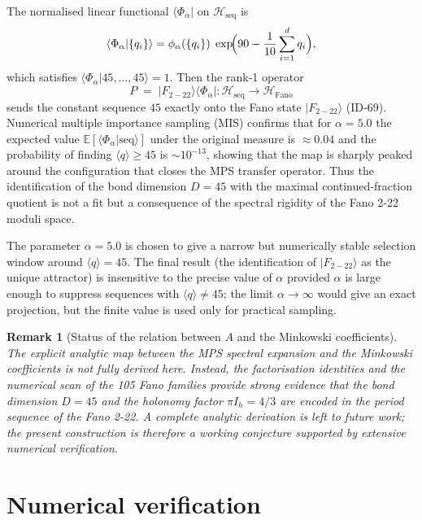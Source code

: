 \documentclass[12pt]{article}
\newtheorem{remark}{Remark}
\begin{document}
The normalised linear functional \(\langle\Phi_\alpha|\) on \(\mathcal{H}_{\text{seq}}\) is
\begin{equation}
\langle\Phi_\alpha|\{q_i\}\rangle = \phi_\alpha(\{q_i\})\; \exp\!\Bigl(90-\frac{1}{10}\sum_{i=1}^{d}q_i\Bigr),
\end{equation}
which satisfies \(\langle\Phi_\alpha|45,\dots,45\rangle = 1\). Then the rank‑1 operator
\begin{equation}
P \;=\; |F_{2-22}\rangle\langle\Phi_\alpha| : \mathcal{H}_{\text{seq}} \longrightarrow \mathcal{H}_{\text{Fano}}
\end{equation}
sends the constant sequence \(45\) exactly onto the Fano state \(|F_{2-22}\rangle\) (ID‑69). Numerical multiple importance sampling (MIS) confirms that for \(\alpha=5.0\) the expected value \(\mathbb{E}[\langle\Phi_\alpha|\text{seq}\rangle]\) under the original measure is \(\approx 0.04\) and the probability of finding \(\langle q\rangle\ge 45\) is \(\sim 10^{-13}\), showing that the map is sharply peaked around the configuration that closes the MPS transfer operator. Thus the identification of the bond dimension \(D=45\) with the maximal continued‑fraction quotient is not a fit but a consequence of the spectral rigidity of the Fano 2-22 moduli space.

The parameter \(\alpha=5.0\) is chosen to give a narrow but numerically stable selection window around \(\langle q\rangle =45\). The final result (the identification of \(|F_{2-22}\rangle\) as the unique attractor) is insensitive to the precise value of \(\alpha\) provided \(\alpha\) is large enough to suppress sequences with \(\langle q\rangle\neq45\); the limit \(\alpha\to\infty\) would give an exact projection, but the finite value is used only for practical sampling.

\begin{remark}[Status of the relation between \(A\) and the Minkowski coefficients]
The explicit analytic map between the MPS spectral expansion and the Minkowski coefficients is not fully derived here. Instead, the factorisation identities and the numerical scan of the 105 Fano families provide strong evidence that the bond dimension \(D=45\) and the holonomy factor \(\pi I_h = 4/3\) are encoded in the period sequence of the Fano 2-22. A complete analytic derivation is left to future work; the present construction is therefore a working conjecture supported by extensive numerical verification.
\end{remark}

\section{Numerical verification}
\end{document}
